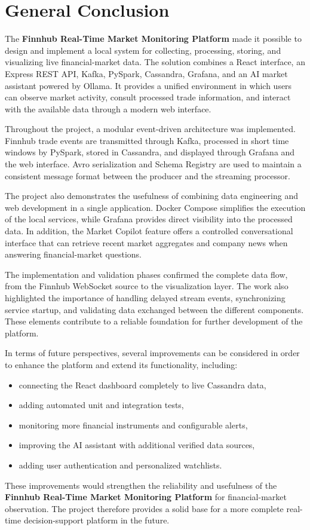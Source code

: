 \chapter*{General Conclusion}

The \textbf{Finnhub Real-Time Market Monitoring Platform} made it possible to design and implement a local system for collecting, processing, storing, and visualizing live financial-market data. The solution combines a React interface, an Express REST API, Kafka, PySpark, Cassandra, Grafana, and an AI market assistant powered by Ollama. It provides a unified environment in which users can observe market activity, consult processed trade information, and interact with the available data through a modern web interface.

Throughout the project, a modular event-driven architecture was implemented. Finnhub trade events are transmitted through Kafka, processed in short time windows by PySpark, stored in Cassandra, and displayed through Grafana and the web interface. Avro serialization and Schema Registry are used to maintain a consistent message format between the producer and the streaming processor.

The project also demonstrates the usefulness of combining data engineering and web development in a single application. Docker Compose simplifies the execution of the local services, while Grafana provides direct visibility into the processed data. In addition, the Market Copilot feature offers a controlled conversational interface that can retrieve recent market aggregates and company news when answering financial-market questions.

The implementation and validation phases confirmed the complete data flow, from the Finnhub WebSocket source to the visualization layer. The work also highlighted the importance of handling delayed stream events, synchronizing service startup, and validating data exchanged between the different components. These elements contribute to a reliable foundation for further development of the platform.

In terms of future perspectives, several improvements can be considered in order to enhance the platform and extend its functionality, including:

\begin{itemize}
    \item connecting the React dashboard completely to live Cassandra data,
    \item adding automated unit and integration tests,
    \item monitoring more financial instruments and configurable alerts,
    \item improving the AI assistant with additional verified data sources,
    \item adding user authentication and personalized watchlists.
\end{itemize}

These improvements would strengthen the reliability and usefulness of the \textbf{Finnhub Real-Time Market Monitoring Platform} for financial-market observation. The project therefore provides a solid base for a more complete real-time decision-support platform in the future.
